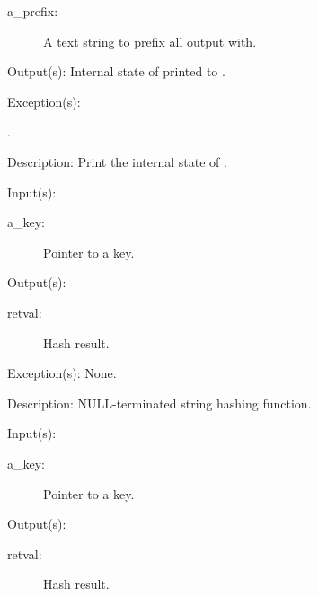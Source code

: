 \begin{capi}
\begin{capilist}
\begin{description}
		\item[a\_prefix: ]
			A text string to prefix all output with.
		\end{description}
	\item[Output(s): ]
		Internal state of  printed to .
	\item[Exception(s): ]
		\begin{description}\item[]
		\item[.]
		\end{description}
	\item[Description: ]
		Print the internal state of .
	\end{capilist}
\label{ch_string_hash}
	\begin{capilist}
	\item[Input(s): ]
		\begin{description}\item[]
		\item[a\_key: ]
			Pointer to a key.
		\end{description}
	\item[Output(s): ]
		\begin{description}\item[]
		\item[retval: ]
			Hash result.
		\end{description}
	\item[Exception(s): ] None.
	\item[Description: ]
		NULL-terminated string hashing function.
	\end{capilist}
\label{ch_direct_hash}
	\begin{capilist}
	\item[Input(s): ]
		\begin{description}\item[]
		\item[a\_key: ]
			Pointer to a key.
		\end{description}
	\item[Output(s): ]
		\begin{description}\item[]
		\item[retval: ]
			Hash result.
		\end{description}

\end{capilist}
\end{capi}
